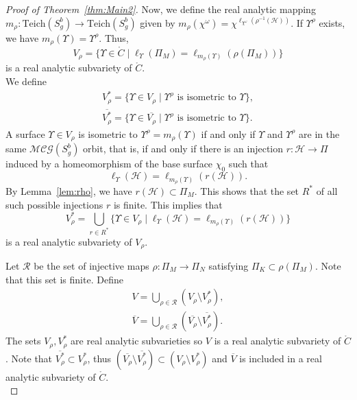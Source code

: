 \documentclass[a4paper,12pt]{article}
\theoremstyle{definition}
\theoremstyle{remark}
\begin{document}
\begin{proof}[Proof of Theorem~\ref{thm:Main2}]
    Now, we define the real analytic mapping $m_{\rho} : \mathrm{Teich}(S_g^b) \to \mathrm{Teich}(S_g^b)$ given by $m_{\rho}(\chi^{\omega})= \chi^{\ell_{\chi^{\omega}} (\rho^{-1}(\mathcal{H}))}$. If $\Upsilon^{\rho}$ exists, we have $m_{\rho}(\Upsilon)=\Upsilon^{\rho}$. Thus, 
    \[
        V_{\rho}=\{\Upsilon \in \mathring{C} \mid \ell_{\Upsilon} (\Pi_M) = \ell_{m_{\rho}(\Upsilon)} ( \rho (\Pi_M)) \}
    \]
    is a real analytic subvariety of $\mathring{C}$.\\
    We define 
    \begin{align*}
        V_{\rho}^*=\{ \Upsilon \in V_{\rho} \mid \Upsilon^{\rho} \text{ is isometric to } \Upsilon \},\\
        \overline{V_{\rho}^*}=\{ \Upsilon \in \overline{V_{\rho}} \mid \Upsilon^{\rho} \text{ is isometric to } \Upsilon \}.
    \end{align*}
    A surface $\Upsilon \in V_{\rho}$ is isometric to $\Upsilon^{\rho}=m_{\rho}(\Upsilon)$ if and only if $\Upsilon$ and $\Upsilon^{\rho}$ are in the same $\mathcal{MCG}(S_g^b)$ orbit, that is, if and only if there is an injection $r : \mathcal{H} \to \Pi$ induced by a homeomorphism of the base surface $\chi_0$ such that 
    \[
        \ell_{\Upsilon} (\mathcal{H})=\ell_{m_{\rho}(\Upsilon)} (r (\mathcal{H})).
    \]
    By Lemma~\ref{lem:rho}, we have $r (\mathcal{H}) \subset \Pi_M$. This shows that the set $R^*$ of all such possible injections $r$ is finite. This implies that
    \[
        V_{\rho}^*= \bigcup_{r \in R^*}\{\Upsilon \in V_{\rho} \mid \ell_{\Upsilon} (\mathcal{H})=\ell_{m_{\rho}(\Upsilon)} (r (\mathcal{H}))\}
    \]
    is a real analytic subvariety of $V_{\rho}$.

    Let $\mathcal{R}$ be the set of injective maps $\rho : \Pi_M \to \Pi_N$ satisfying $\Pi_K \subset \rho (\Pi_M)$. Note that this set is finite. Define
    \begin{align*}
        V = \bigcup_{\rho \in \mathcal{R}}(V_{\rho} \setminus V_{\rho}^*),\\
        \overline{V} = \bigcup_{\rho \in \mathcal{R}}(\overline{V_{\rho}} \setminus \overline{V_{\rho}^*}).
    \end{align*}
    The sets $V_{\rho}, V_{\rho}^*$ are real analytic subvarieties so $V$ is a real analytic subvariety of $\mathring{C}$. Note that $\overline{V_{\rho}^*} \subset V_{\rho}^*$, thus $(\overline{V_{\rho}} \setminus \overline{V_{\rho}^*}) \subset (V_{\rho} \setminus V_{\rho}^*)$ and $\overline{V}$ is included in a real analytic subvariety of $\mathring{C}$. \\
    

\end{proof}
\end{document}
